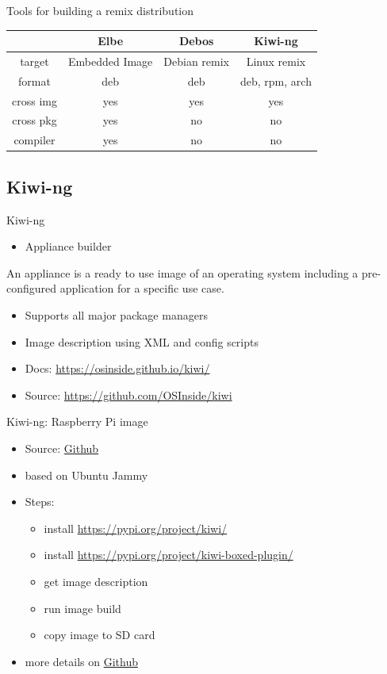 \documentclass{beamer}
\begin{document}
\begin{frame}{Tools for building a remix distribution}
	\begin{tabular}{c|ccc}
		& \textbf{Elbe} & \textbf{Debos} & \textbf{Kiwi-ng} \\
		\hline
		target & Embedded Image & Debian remix & Linux remix \\ 
		format & deb & deb & deb, rpm, arch \\
		cross img & yes & yes & yes \\
		cross pkg & yes & no & no \\
		compiler & yes & no & no \\
	\end{tabular}
\end{frame}

\subsection{Kiwi-ng}

\begin{frame}{Kiwi-ng}
	\begin{itemize}
		\item Appliance builder
	\end{itemize}
	\begin{definition} 
		An appliance is a ready to use image of an operating system including a pre-configured application for a specific use case. 
	\end{definition}
	\begin{itemize}
		\item Supports all major package managers
		\item Image description using XML and config scripts
		\item Docs: \url{https://osinside.github.io/kiwi/}
		\item Source: \url{https://github.com/OSInside/kiwi}
	\end{itemize}
\end{frame}

\begin{frame}{Kiwi-ng: Raspberry Pi image}
	\begin{itemize}
		\item Source: \href{https://github.com/OSInside/kiwi-descriptions/tree/main/ubuntu/aarch64/ubuntu-jammy-rpi}{Github}
		\item based on Ubuntu Jammy
		\item Steps:
		\begin{itemize}
			\item install \url{https://pypi.org/project/kiwi/}
			\item install \url{https://pypi.org/project/kiwi-boxed-plugin/}
			\item get image description
			\item run image build
			\item copy image to SD card
		\end{itemize}
		\item more details on \href{https://github.com/tomirgang/eh21_maintainable_linux/tree/main/examples/first_build_rpi4/kiwi-ng}{Github}
	\end{itemize}
\end{frame}
\end{document}
